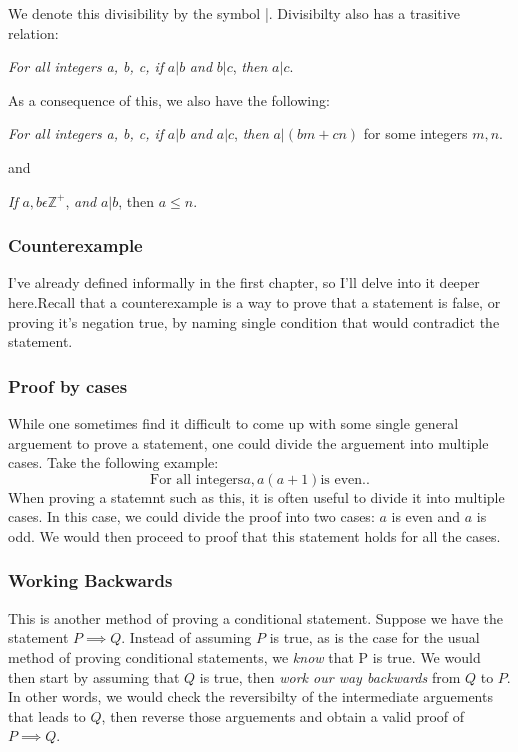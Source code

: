 \documentclass[a4paper]{article}
\begin{document}
We denote this divisibility by the symbol |. Divisibilty also has a trasitive relation:
\begin{tcolorbox}
	\textit{For all integers a, b, c, if } $a | b$ \textit{and}  $b | c$, \textit{then}  $a | c$.
\end{tcolorbox}
\noindent As a consequence of this, we also have the following:
\begin{tcolorbox}
	\textit{For all integers a, b, c, if } $a | b$ \textit{and}  $a | c$, \textit{then}  $a | \left( bm + cn \right) $ for some integers $m,n$.
\end{tcolorbox}
and
\begin{tcolorbox}
	\textit{If} $a,b \epsilon \mathbb{Z}^{+}$, \textit{and}	$a | b$, then  $a\le n$.			
\end{tcolorbox}

\subsubsection{Counterexample}
I've already defined informally in the first chapter, so I'll delve into it deeper here.Recall that a counterexample is a way to prove that a statement is false, or proving it's negation true, by naming single condition that would contradict the statement.

\subsubsection{Proof by cases}
While one sometimes find it difficult to come up with some single general arguement to prove a statement, one could divide the arguement into multiple cases. Take the following example: \[
	\text{For all integers} a, a\left( a+1 \right) \text{is even.} 
.\] 
When proving a statemnt such as this, it is often useful to divide it into multiple cases. In this case, we could divide the proof into two cases: $a$ is even and $a$ is odd. We would then proceed to proof that this statement holds for all the cases.

\subsubsection{Working Backwards}
This is another method of proving a conditional statement. Suppose we have the statement $ P \implies Q$. Instead of assuming $P$ is true, as is the case for the usual method of proving conditional statements, we \textit{know} that P is true. We would then start by assuming that $Q$ is true, then \textit{work our way backwards} from  $Q$ to  $P$. In other words, we would check the reversibilty of the intermediate arguements that leads to  $Q$, then reverse those arguements and obtain a valid proof of  $P \implies Q$.
\end{document}
